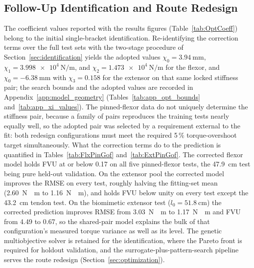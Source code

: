 \subsection{Follow-Up Identification and Route Redesign}\label{sec:ongoing}

The coefficient values reported with the results figures (Table~\ref{tab:OptCoeff}) belong to the initial single-bracket identification. Re-identifying the correction terms over the full test sets with the two-stage procedure of Section~\ref{sec:identification} yields the adopted values $\chi_{0} = \qty{+3.94}{\mm}$, $\chi_{1} = \qty{3.998e4}{\N\per\m}$, and $\chi_{2} = \qty{1.473e4}{\N\per\m}$ for the flexor, and $\chi_{0} = \qty{-6.38}{\mm}$ with $\chi_{3} = 0.158$ for the extensor on that same locked stiffness pair; the search bounds and the adopted values are recorded in Appendix~\ref{app:model_geometry} (Tables~\ref{tab:app_opt_bounds} and~\ref{tab:app_xi_values}). The pinned-flexor data do not uniquely determine the stiffness pair, because a family of pairs reproduces the training tests nearly equally well, so the adopted pair was selected by a requirement external to the fit: both redesign configurations must meet the required 5\,\% torque-overshoot target simultaneously. What the correction terms do to the prediction is quantified in Tables~\ref{tab:FlxPinGof} and~\ref{tab:ExtPinGof}. The corrected flexor model holds FVU at or below 0.17 on all five pinned-flexor tests, the \qty{47.9}{\cm} test being pure held-out validation. On the extensor pool the corrected model improves the RMSE on every test, roughly halving the fitting-set mean (\qty{2.60}{\newton\cdot\meter} to \qty{1.16}{\newton\cdot\meter}), and holds FVU below unity on every test except the \qty{43.2}{\cm} tendon test. On the biomimetic extensor test ($l_{0} = \qty{51.8}{\cm}$) the corrected prediction improves RMSE from \qty{3.03}{\newton\cdot\meter} to \qty{1.17}{\newton\cdot\meter} and FVU from 4.49 to 0.67, so the shared-pair model explains the bulk of that configuration's measured torque variance as well as its level. The genetic multiobjective solver is retained for the identification, where the Pareto front is required for holdout validation, and the surrogate-plus-pattern-search pipeline serves the route redesign (Section~\ref{sec:optimization}).

